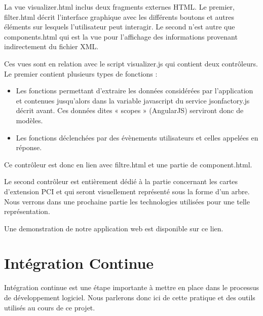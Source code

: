 \documentclass [a4paper,11pt]{article}
\begin{document}
La vue visualizer.html inclus deux fragments externes HTML. Le premier, filter.html décrit l’interface graphique avec les différents boutons et autres éléments sur lesquels l’utilisateur peut interagir. Le second n’est autre que components.html qui est la vue pour l’affichage des informations provenant indirectement du fichier XML.
\newline

Ces vues sont en relation avec le script visualizer.js qui contient deux contrôleurs. Le premier contient plusieurs types de fonctions :
\newline

\begin{itemize}
 \item Les fonctions permettant d’extraire les données considérées par l’application et contenues jusqu’alors dans la variable javascript du service jsonfactory.js décrit avant. Ces données dites « scopes » (AngularJS) serviront donc de modèles.
 \item Les fonctions déclenchées par des évènements utilisateurs et celles appelées en réponse.
 \newline
\end{itemize}

Ce contrôleur est donc en lien avec filtre.html et une partie de component.html.
\newline

Le second contrôleur est entièrement dédié à la partie concernant les cartes d’extension PCI et qui seront visuellement représenté sous la forme d’un arbre. Nous verrons dans une prochaine partie les technologies utilisées pour une telle représentation.
\newline

Une demonstration de notre application web est disponible sur ce lien.\cite{APPLI}

\section{Intégration Continue}

Intégration continue est une étape importante à mettre en place dans le processus de développement logiciel. Nous parlerons donc ici de cette pratique et des outils utilisés au cours de ce projet.
\end{document}
